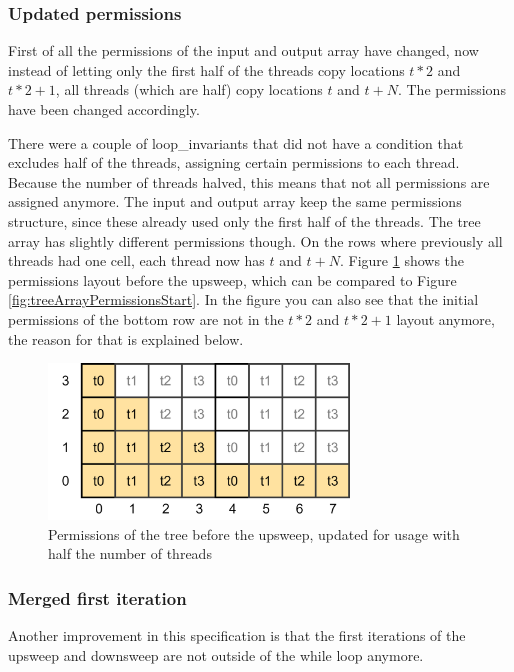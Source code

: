 \documentclass[a4paper]{article}
\begin{document}
\subsubsection{Updated permissions}
First of all the permissions of the input and output array have changed, now instead of letting only the first half of the threads copy locations $t*2$ and $t*2+1$, all threads (which are half) copy locations $t$ and $t+N$. The permissions have been changed accordingly.

There were a couple of loop\_invariants that did not have a condition that excludes half of the threads, assigning certain permissions to each thread. Because the number of threads halved, this means that not all permissions are assigned anymore. The input and output array keep the same permissions structure, since these already used only the first half of the threads. The tree array has slightly different permissions though. On the rows where previously all threads had one cell, each thread now has $t$ and $t+N$. Figure \ref{fig:treeArrayPermissionsStartHalfThreads} shows the permissions layout before the upsweep, which can be compared to Figure \ref{fig:treeArrayPermissionsStart}. In the figure you can also see that the initial permissions of the bottom row are not in the $t*2$ and $t*2+1$ layout anymore, the reason for that is explained below.

\begin{figure}[htb!]
	\centering
	\includegraphics[width=80mm]{../images/tree-permissions-start-halfthreads-v1.png}
	\caption{Permissions of the tree before the upsweep, updated for usage with half the number of threads}
	\label{fig:treeArrayPermissionsStartHalfThreads}
\end{figure}
\FloatBarrier

\subsubsection{Merged first iteration}
Another improvement in this specification is that the first iterations of the upsweep and downsweep are not outside of the while loop anymore.
\end{document}
